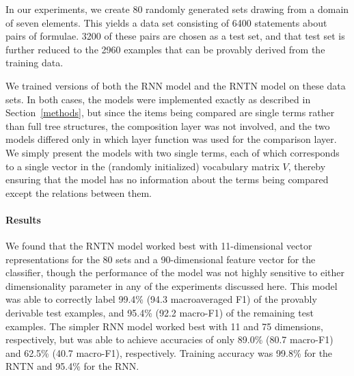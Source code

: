 
In our experiments, we create 80 randomly generated sets drawing from
a domain of seven elements. This yields a data set consisting of
6400 statements about pairs of formulae. 3200 of these pairs are
chosen as a test set, and that test set is further reduced to the 2960
examples that can be provably derived from the training data.

We trained versions of both the RNN model and the RNTN model on these
data sets. In both cases, the models were implemented exactly as
described in Section~\ref{methods}, but since the items being compared
are single terms rather than full tree structures, the composition
layer was not involved, and the two models differed only in which
layer function was used for the comparison layer. We simply present
the models with two single terms, each of which corresponds to a
single vector in the (randomly initialized) vocabulary matrix $V$,
thereby ensuring that the model has no information about the terms
being compared except the relations between them.

\paragraph{Results} 
We found that the RNTN model worked best with 11-dimensional vector
representations for the 80 sets and a 90-dimensional feature vector
for the classifier, though the performance of the model was not highly
sensitive to either dimensionality parameter in any of the experiments
discussed here. This model was able to correctly label 99.4\% (94.3
macroaveraged F1) of the provably derivable test examples, and 95.4\%
(92.2 macro-F1) of the remaining test examples. The simpler RNN model worked
best with 11 and 75 dimensions, respectively, but was able to achieve
accuracies of only 89.0\% (80.7 macro-F1) and 62.5\% (40.7 macro-F1),
respectively. Training accuracy was 99.8\% for the RNTN and 95.4\% for
the RNN.


